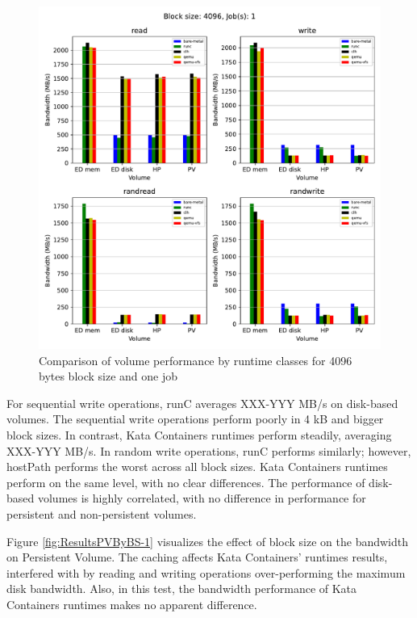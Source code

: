 \begin{figure}[ht]
  \begin{center}
    \includegraphics[width=12cm]{results/subplot_bw_by_volume_with_bare(4096,1).pdf}
    \caption{Comparison of volume performance by runtime classes for 4096 bytes block size and one job}
    \label{fig:ResultsVolumeByRTC4096-1}
  \end{center}
\end{figure}

For sequential write operations, runC averages XXX-YYY MB/s on disk-based volumes. The sequential write operations perform poorly in 4 kB and bigger block sizes. In contrast, Kata Containers runtimes perform steadily, averaging XXX-YYY MB/s. In random write operations, runC performs similarly; however, hostPath performs the worst across all block sizes. Kata Containers runtimes perform on the same level, with no clear differences. The performance of disk-based volumes is highly correlated, with no difference in performance for persistent and non-persistent volumes.

Figure \ref{fig:ResultsPVByBS-1} visualizes the effect of block size on the bandwidth on Persistent Volume. The caching affects Kata Containers' runtimes results, interfered with by reading and writing operations over-performing the maximum disk bandwidth. Also, in this test, the bandwidth performance of Kata Containers runtimes makes no apparent difference.

